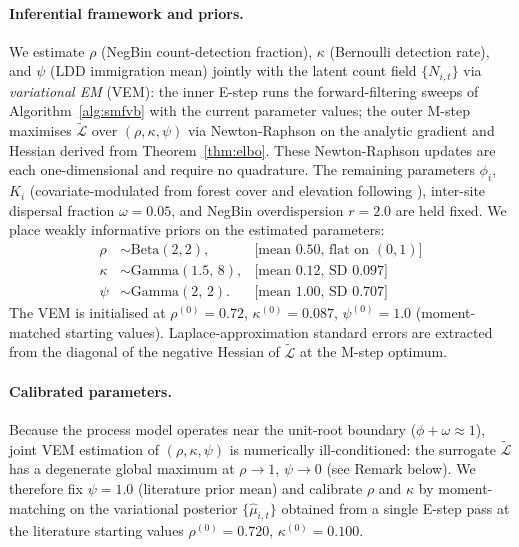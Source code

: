 \documentclass[review,12pt]{elsarticle}
\theoremstyle{definition}
\begin{document}
\paragraph{Inferential framework and priors.}
We estimate $\rho$ (NegBin count-detection fraction), $\kappa$ (Bernoulli
detection rate), and $\psi$ (LDD immigration mean) jointly with the latent
count field $\{N_{i,t}\}$ via \emph{variational EM} (VEM): the inner
E-step runs the forward-filtering sweeps of Algorithm~\ref{alg:smfvb} with the current
parameter values; the outer M-step maximises $\tilde{\mathcal{L}}$ over
$(\rho,\kappa,\psi)$ via Newton-Raphson on the analytic gradient and
Hessian derived from Theorem~\ref{thm:elbo}.  These Newton-Raphson updates
are each one-dimensional and require no quadrature.  The remaining
parameters $\phi_i$, $K_i$ (covariate-modulated from forest cover and
elevation following \citealt{glutz1993}), inter-site dispersal fraction
$\omega=0.05$, and NegBin overdispersion $r=2.0$ are held fixed.
We place weakly informative priors on the estimated parameters:
\begin{align*}
  \rho   &\sim \mathrm{Beta}(2,2),             & \text{[mean 0.50, flat on }(0,1)\text{]}\\
  \kappa &\sim \mathrm{Gamma}(1.5,\, 8),       & \text{[mean 0.12, SD 0.097]}\\
  \psi   &\sim \mathrm{Gamma}(2,\, 2).         & \text{[mean 1.00, SD 0.707]}
\end{align*}
The VEM is initialised at $\rho^{(0)}=0.72$, $\kappa^{(0)}=0.087$,
$\psi^{(0)}=1.0$ (moment-matched starting values).  Laplace-approximation
standard errors are extracted from the diagonal of the negative Hessian of
$\tilde{\mathcal{L}}$ at the M-step optimum.

\paragraph{Calibrated parameters.}
\label{para:mhb-calibration}
Because the process model operates near the unit-root boundary
($\phi+\omega\approx1$), joint VEM estimation of $(\rho,\kappa,\psi)$ is
numerically ill-conditioned: the surrogate $\tilde{\mathcal{L}}$ has a
degenerate global maximum at $\rho\to1$, $\psi\to0$ (see Remark below).
We therefore fix $\psi=1.0$ (literature prior mean) and calibrate $\rho$
and $\kappa$ by moment-matching on the variational posterior
$\{\hat\mu_{i,t}\}$ obtained from a single E-step pass at the literature
starting values $\rho^{(0)}=0.720$, $\kappa^{(0)}=0.100$.
\end{document}
